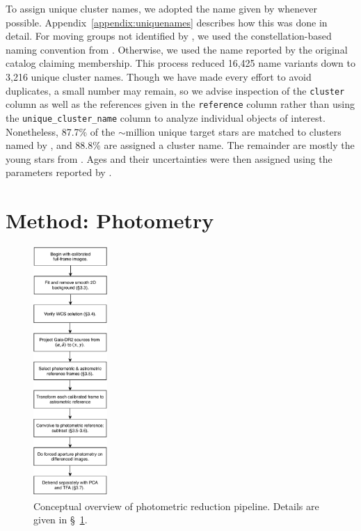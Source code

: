 \documentclass[12pt,twocolumn,tighten]{aastex62}
\begin{document}
To assign unique cluster names, we adopted the name given by
\citet{Kharchenko_et_al_2013} whenever possible.
Appendix~\ref{appendix:uniquenames} describes  how this was done in detail.
For moving groups not identified by \citet{Kharchenko_et_al_2013}, we used
the constellation-based naming convention from
\citet{gagne_banyan_XI_2018}.  Otherwise, we used the name reported by
the original catalog claiming membership.  This process reduced 16,425
name variants down to 3,216 unique cluster names.  Though we have
made every effort to avoid duplicates, a small number may remain, so we
advise inspection of the \texttt{cluster} column
as well as the references given in the
\texttt{reference} column rather than using the
\texttt{unique\_cluster\_name} column to analyze individual objects
of interest.  Nonetheless, 87.7\% of the $\sim$million unique target
stars are matched to clusters named by \citet{Kharchenko_et_al_2013},
and 88.8\% are assigned a cluster name.  The remainder are mostly the
young stars from \citet{zari_3d_2018}.
Ages and their uncertainties were then assigned using the 
parameters reported by \citet{Kharchenko_et_al_2013}.




\section{Method: Photometry}
\label{sec:method}

\begin{figure}[!t]
	\begin{center}
		\leavevmode
		\includegraphics[width=0.25\textwidth]{pipelineoverview.pdf}
	\end{center}
	\vspace{-0.2cm}
	\caption{
    Conceptual overview of photometric reduction pipeline.
    Details are given in \S~\ref{sec:method}.
	\label{fig:pipeline}
	}
\end{figure}
\end{document}
